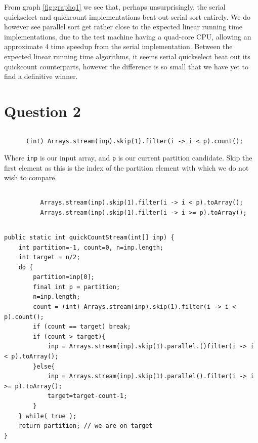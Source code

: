 \documentclass[a5paper]{article}
\begin{document}
From graph \ref{fig:graphq1} we see that, perhaps unsurprisingly, the serial quickselect and quickcount implementations beat out serial sort entirely.
We do however see parallel sort get rather close to the expected linear running time implementations, due to the test machine having a quad-core CPU,
allowing an approximate 4 time speedup from the serial implementation. Between the expected linear running time algorithms, it seems serial quickselect 
beat out its quickcount counterparts, however the difference is so small that we have yet to find a definitive winner.

\subsection{}


\section{Question 2}
\subsection{}
\begin{lstlisting}
      (int) Arrays.stream(inp).skip(1).filter(i -> i < p).count();
\end{lstlisting}
Where \texttt{inp} is our input array, and \texttt{p} is our current partition candidate.
Skip the first element as this is the index of the partition element with which we do not wish to compare.

\subsection{}
\begin{lstlisting}
          Arrays.stream(inp).skip(1).filter(i -> i < p).toArray();
          Arrays.stream(inp).skip(1).filter(i -> i >= p).toArray();
\end{lstlisting}

\subsection{}
\begin{lstlisting}
public static int quickCountStream(int[] inp) {
    int partition=-1, count=0, n=inp.length;
    int target = n/2;
    do {
        partition=inp[0];
        final int p = partition;
        n=inp.length;
        count = (int) Arrays.stream(inp).skip(1).filter(i -> i < p).count();
        if (count == target) break;
        if (count > target){
            inp = Arrays.stream(inp).skip(1).parallel.()filter(i -> i < p).toArray();
        }else{
            inp = Arrays.stream(inp).skip(1).parallel().filter(i -> i >= p).toArray();
            target=target-count-1;
        }
    } while( true );
    return partition; // we are on target
}
\end{lstlisting}
\end{document}
